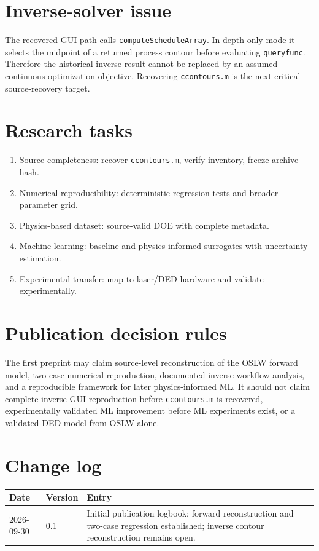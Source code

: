 \documentclass[11pt,a4paper]{article}
\begin{document}
\section{Inverse-solver issue}
The recovered GUI path calls \texttt{computeScheduleArray}. In depth-only mode it
selects the midpoint of a returned process contour before evaluating
\texttt{queryfunc}. Therefore the historical inverse result cannot be replaced by
an assumed continuous optimization objective. Recovering \texttt{ccontours.m} is
the next critical source-recovery target.
\section{Research tasks}
\begin{enumerate}
\item Source completeness: recover \texttt{ccontours.m}, verify inventory, freeze archive hash.
\item Numerical reproducibility: deterministic regression tests and broader parameter grid.
\item Physics-based dataset: source-valid DOE with complete metadata.
\item Machine learning: baseline and physics-informed surrogates with uncertainty estimation.
\item Experimental transfer: map to laser/DED hardware and validate experimentally.
\end{enumerate}
\section{Publication decision rules}
The first preprint may claim source-level reconstruction of the OSLW forward model,
two-case numerical reproduction, documented inverse-workflow analysis, and a
reproducible framework for later physics-informed ML. It should not claim complete
inverse-GUI reproduction before \texttt{ccontours.m} is recovered, experimentally
validated ML improvement before ML experiments exist, or a validated DED model from
OSLW alone.
\section{Change log}
\begin{longtable}{p{}p{}p{}}
\toprule Date & Version & Entry\\ \midrule
2026-09-30 & 0.1 & Initial publication logbook; forward reconstruction and two-case regression established; inverse contour reconstruction remains open.\\
\bottomrule
\end{longtable}
\end{document}
